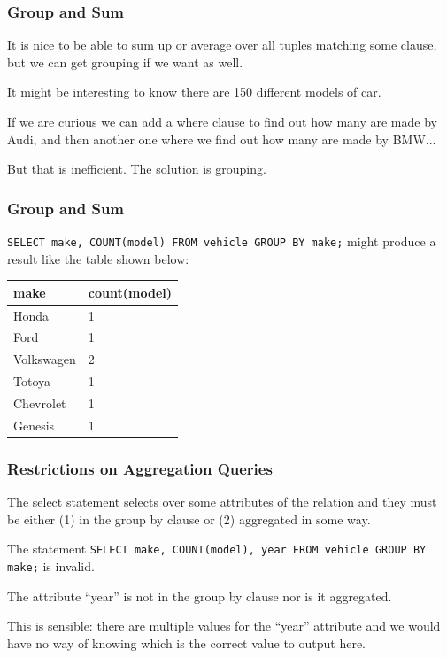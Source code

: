 \begin{frame}
\frametitle{Group and Sum}

It is nice to be able to sum up or average over all tuples matching some clause, but we can get grouping if we want as well. 

It might be interesting to know there are 150 different models of car. 

If we are curious we can add a where clause to find out how many are made by Audi, and then another one where we find out how many are made by BMW... 

But that is inefficient. The solution is grouping.


\end{frame}



\begin{frame}
\frametitle{Group and Sum}

\texttt{SELECT make, COUNT(model) FROM vehicle GROUP BY make;} might produce a result like the table shown below:

\begin{center}
\begin{tabular}{|l|l|}\hline
	\textbf{make} & \textbf{count(model)} \\ \hline
	Honda & 1  \\ \hline
	Ford & 1  \\ \hline
	Volkswagen & 2  \\ \hline
	Totoya & 1  \\ \hline
	Chevrolet & 1  \\ \hline
	Genesis & 1  \\ \hline
\end{tabular}
\end{center}

\end{frame}



\begin{frame}
\frametitle{Restrictions on Aggregation Queries}

The select statement selects over some attributes of the relation and they must be either (1) in the group by clause or (2) aggregated in some way. 

The statement \texttt{SELECT make, COUNT(model), year FROM vehicle GROUP BY make;} is invalid.

The attribute ``year'' is not in the group by clause nor is it aggregated. 

This is sensible: there are multiple values for the ``year'' attribute and we would have no way of knowing which is the correct value to output here.

\end{frame}


